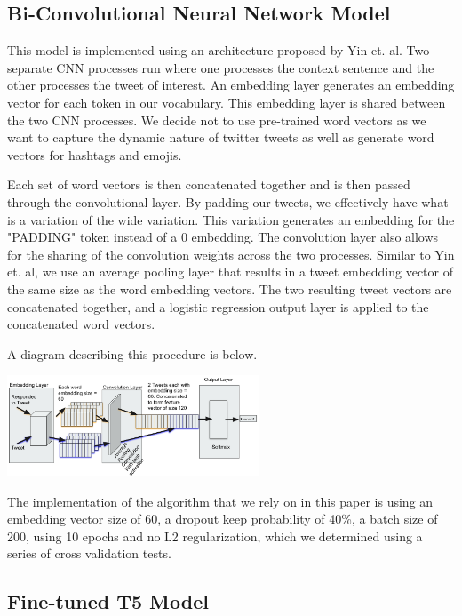 \documentclass[11pt,a4paper]{article}
\begin{document}
\subsection{Bi-Convolutional Neural Network Model}

This model is implemented using an architecture proposed by Yin et. al. Two separate CNN processes run where one processes the context sentence and the other processes the tweet of interest. An embedding layer generates an embedding vector for each token in our vocabulary. This embedding layer is shared between the two CNN processes. We decide not to use pre-trained word vectors as we want to capture the dynamic nature of twitter tweets as well as generate word vectors for hashtags and emojis. 

Each set of word vectors is then concatenated together and is then passed through the convolutional layer. By padding our tweets, we effectively have what is a variation of the wide variation. This variation generates an embedding for the "PADDING" token instead of a 0 embedding. The convolution layer also allows for the sharing of the convolution weights across the two processes. Similar to Yin et. al, we use an average pooling layer that results in a tweet embedding vector of the same size as the word embedding vectors. The two resulting tweet vectors are concatenated together, and a logistic regression output layer is applied to the concatenated word vectors.

A diagram describing this procedure is below.

\includegraphics[width=75mm,scale=0.5]{bcnn.png}

The implementation of the algorithm that we rely on in this paper is using an embedding vector size of 60, a dropout keep probability of 40\%, a batch size of 200, using 10 epochs and no L2 regularization, which we determined using a series of cross validation tests.

\subsection{Fine-tuned T5 Model}
\end{document}
